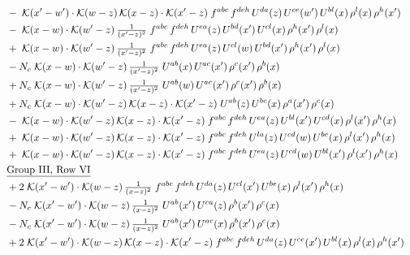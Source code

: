 \documentclass[10pt]{article}
\numberwithin{equation}{section}
\begin{document}
\begin{align}
&\quad -\;\mathcal{K}(x'-w')\cdot\mathcal{K}(w-z)\,\mathcal{K}(x-z)\cdot\mathcal{K}(x'-z)\;f^{abc}\,f^{deh}\,U^{da}(z)\,U^{ce}(w')\,U^{bl}(x)\,\rho^{l}(x)\,\rho^{h}(x')\notag\\
&\quad -\;\mathcal{K}(x-w)\cdot\mathcal{K}(w'-z)\,\tfrac{1}{(x'-z)^{2}}\;f^{abc}\,f^{deh}\,U^{ea}(z)\,U^{bd}(x')\,U^{cl}(x)\,\rho^{h}(x')\,\rho^{l}(x)\notag\\
&\quad +\;\mathcal{K}(x-w)\cdot\mathcal{K}(w'-z)\,\tfrac{1}{(x'-z)^{2}}\;f^{abc}\,f^{deh}\,U^{ea}(z)\,U^{cl}(w)\,U^{bd}(x')\,\rho^{h}(x')\,\rho^{l}(x)\notag\\
&\quad -N_c\;\mathcal{K}(x-w)\cdot\mathcal{K}(w'-z)\,\tfrac{1}{(x'-z)^{2}}\;U^{ab}(x)\,U^{ac}(x')\,\rho^{c}(x')\,\rho^{b}(x)\notag\\
&\quad +N_c\;\mathcal{K}(x-w)\cdot\mathcal{K}(w'-z)\,\tfrac{1}{(x'-z)^{2}}\;U^{ab}(w)\,U^{ac}(x')\,\rho^{c}(x')\,\rho^{b}(x)\notag\\
&\quad +N_c\;\mathcal{K}(x-w)\cdot\mathcal{K}(w'-z)\,\mathcal{K}(x-z)\cdot\mathcal{K}(x'-z)\;U^{ab}(z)\,U^{bc}(x)\,\rho^{a}(x')\,\rho^{c}(x)\notag\\
&\quad -\;\mathcal{K}(x-w)\cdot\mathcal{K}(w'-z)\,\mathcal{K}(x-z)\cdot\mathcal{K}(x'-z)\;f^{abc}\,f^{deh}\,U^{ea}(z)\,U^{bl}(x')\,U^{cd}(x)\,\rho^{l}(x')\,\rho^{h}(x)\notag\\
&\quad +\;\mathcal{K}(x-w)\cdot\mathcal{K}(w'-z)\,\mathcal{K}(x-z)\cdot\mathcal{K}(x'-z)\;f^{abc}\,f^{deh}\,U^{la}(z)\,U^{cd}(w)\,U^{be}(x)\,\rho^{l}(x')\,\rho^{h}(x)\notag\\
&\quad +\;\mathcal{K}(x-w)\cdot\mathcal{K}(w'-z)\,\mathcal{K}(x-z)\cdot\mathcal{K}(x'-z)\;f^{abc}\,f^{deh}\,U^{ea}(z)\,U^{cd}(w)\,U^{bl}(x')\,\rho^{l}(x')\,\rho^{h}(x)\notag\\
&\quad\underline{\text{Group III, Row VI}}\notag\\
&\quad +2\;\mathcal{K}(x'-w')\cdot\mathcal{K}(w-z)\,\tfrac{1}{(x-z)^{2}}\;f^{abc}\,f^{deh}\,U^{da}(z)\,U^{cl}(x')\,U^{be}(x)\,\rho^{l}(x')\,\rho^{h}(x)\notag\\
&\quad -N_c\;\mathcal{K}(x'-w')\cdot\mathcal{K}(w-z)\,\tfrac{1}{(x-z)^{2}}\;U^{ab}(x')\,U^{ca}(z)\,\rho^{b}(x')\,\rho^{c}(x)\notag\\
&\quad -N_c\;\mathcal{K}(x'-w')\cdot\mathcal{K}(w-z)\,\tfrac{1}{(x-z)^{2}}\;U^{ab}(x')\,U^{ac}(x)\,\rho^{b}(x')\,\rho^{c}(x)\notag\\
&\quad +2\;\mathcal{K}(x'-w')\cdot\mathcal{K}(w-z)\,\mathcal{K}(x-z)\cdot\mathcal{K}(x'-z)\;f^{abc}\,f^{deh}\,U^{da}(z)\,U^{ce}(x')\,U^{bl}(x)\,\rho^{l}(x)\,\rho^{h}(x')\notag\\

\end{align}
\end{document}
